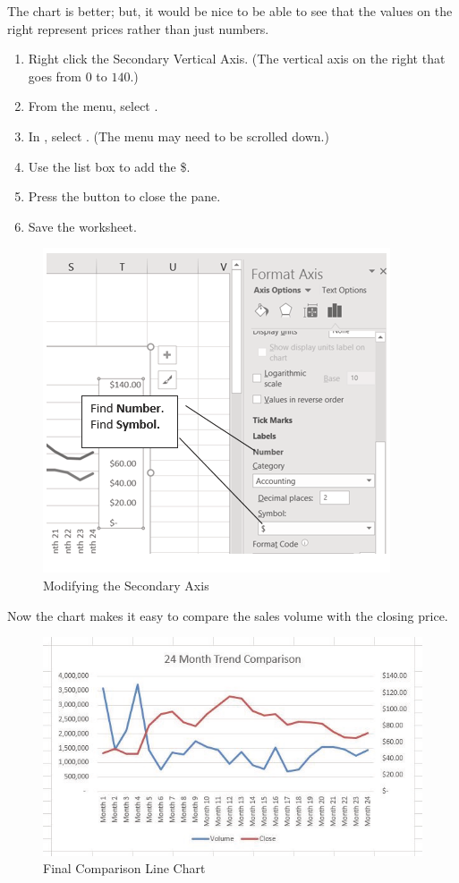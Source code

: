 The chart is better; but, it would be nice to be able to see that the values on the right represent prices rather than just numbers.

\begin{enumerate}
	\item Right click the Secondary Vertical Axis. (The vertical axis on the right that goes from $ 0 $ to $ 140 $.)
	\item From the menu, select .
	\item In , select . (The menu may need to be scrolled down.)
	\item Use the  list box to add the \$.
	\item Press the  button to close the  pane.
	\item Save the worksheet.
\end{enumerate}

\begin{figure}[H]
	\centering
	\includegraphics[width=\maxwidth{.95\linewidth}]{gfx/ch04_fig09}
	\caption{Modifying the Secondary Axis}
	\label{04:fig09}
\end{figure}

Now the chart makes it easy to compare the sales volume with the closing price.

\begin{figure}[H]
	\centering
	\includegraphics[width=\maxwidth{.95\linewidth}]{gfx/ch04_fig10}
	\caption{Final Comparison Line Chart}
	\label{04:fig10}
\end{figure}

